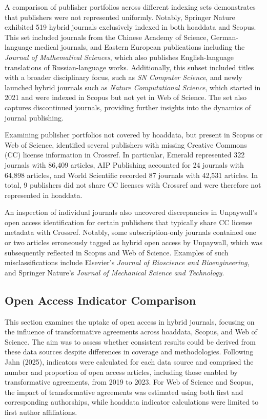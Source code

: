 \documentclass[a4paper,man,floatsintext,longtable,noextraspace,10pt]{apa6}
\begin{document}
A comparison of publisher portfolios across different indexing sets
demonstrates that publishers were not represented uniformly. Notably,
Springer Nature exhibited 519 hybrid journals exclusively indexed in
both hoaddata and Scopus. This set included journals from the Chinese
Academy of Science, German-language medical journals, and Eastern
European publications including the \emph{Journal of Mathematical
Sciences}, which also publishes English-language translations of
Russian-language works. Additionally, this subset included titles with a
broader disciplinary focus, such as \emph{SN Computer Science}, and
newly launched hybrid journals such as \emph{Nature Computational
Science}, which started in 2021 and were indexed in Scopus but not yet
in Web of Science. The set also captures discontinued journals,
providing further insights into the dynamics of journal publishing.

Examining publisher portfolios not covered by hoaddata, but present in
Scopus or Web of Science, identified several publishers with missing
Creative Commons (CC) license information in Crossref. In particular,
Emerald represented 322 journals with 86,409 articles, AIP Publishing
accounted for 24 journals with 64,898 articles, and World Scientific
recorded 87 journals with 42,531 articles. In total, 9 publishers did
not share CC licenses with Crossref and were therefore not represented
in hoaddata.

An inspection of individual journals also uncovered discrepancies in
Unpaywall's open access identification for certain publishers that
typically share CC license metadata with Crossref. Notably, some
subscription-only journals contained one or two articles erroneously
tagged as hybrid open access by Unpaywall, which was subsequently
reflected in Scopus and Web of Science. Examples of such
misclassifications include Elsevier's \emph{Journal of Bioscience and
Bioengineering}, and Springer Nature's \emph{Journal of Mechanical
Science and Technology}.

\subsection{Open Access Indicator
Comparison}\label{open-access-indicator-comparison}

This section examines the uptake of open access in hybrid journals,
focusing on the influence of transformative agreements across hoaddata,
Scopus, and Web of Science. The aim was to assess whether consistent
results could be derived from these data sources despite differences in
coverage and methodologies. Following Jahn (2025), indicators were
calculated for each data source and comprised the number and proportion
of open access articles, including those enabled by transformative
agreements, from 2019 to 2023. For Web of Science and Scopus, the impact
of transformative agreements was estimated using both first and
corresponding authorships, while hoaddata indicator calculations were
limited to first author affiliations.
\end{document}
